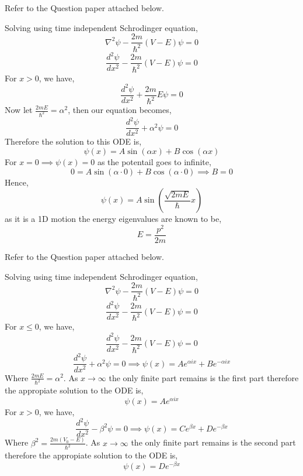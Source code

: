 \documentclass[addpoints]{exam}
\begin{document}
\begin{questions}
    \pagebreak
    \question[] Refer to the Question paper attached below.
    \begin{solution}
        Solving using time independent Schrodinger equation,
        \[\nabla^2\psi-\frac{2m}{\hslash^2}(V-E)\psi=0\]
        \[\frac{d^2\psi}{dx^2}-\frac{2m}{\hslash^2}(V-E)\psi=0\]
        For \(x>0\), we have,
        \[\frac{d^2\psi}{dx^2}+\frac{2m}{\hslash^2}E\psi=0\]
        Now let \(\displaystyle\frac{2mE}{\hslash^2}=\alpha^2\), then our equation becomes,
        \[\frac{d^2\psi}{dx^2}+\alpha^2\psi=0\]
        Therefore the solution to this ODE is,
        \[\psi(x)=A\sin(\alpha x)+B\cos(\alpha x)\]
        For \(x=0\implies\psi(x)=0\) as the potentail goes to infinite,
        \[0=A\sin(\alpha\cdot 0)+B\cos(\alpha\cdot 0)\implies B = 0\]
        Hence,
        \[\psi(x)=A\sin\left(\frac{\sqrt{2mE}}{\hslash}x\right)\]
        as it is a 1D motion the energy eigenvalues are known to be,
        \[E=\frac{p^2}{2m}\]
    \end{solution}

    \pagebreak
    \question Refer to the Question paper attached below.
    \begin{solution}
        Solving using time independent Schrodinger equation,
        \[\nabla^2\psi-\frac{2m}{\hslash^2}(V-E)\psi=0\]
        \[\frac{d^2\psi}{dx^2}-\frac{2m}{\hslash^2}(V-E)\psi=0\]
        For \(x\leq 0\), we have,
        \[\frac{d^2\psi}{dx^2}-\frac{2m}{\hslash^2}(V-E)\psi=0\]
        \[\frac{d^2\psi}{dx^2}+\alpha^2\psi=0\implies \psi(x)=Ae^{\alpha ix}+Be^{-\alpha ix}\]
        Where \(\displaystyle\frac{2mE}{\hslash^2}=\alpha^2\). As \(x\rightarrow\infty\) the only finite part remains is the first part therefore the appropiate solution to the ODE is,
        \[\psi(x)=Ae^{\alpha ix}\]
        For \(x>0\), we have,
        \[\frac{d^2\psi}{dx^2}-\beta^2\psi=0\implies \psi(x)=Ce^{\beta x}+De^{-\beta x}\]
        Where \(\displaystyle\beta^2=\frac{2m(V_0-E)}{\hslash^2}\). As \(x\rightarrow\infty\) the only finite part remains is the second part therefore the appropiate solution to the ODE is,
        \[\psi(x)=De^{-\beta x}\]

    \end{solution}


\end{questions}
\end{document}
